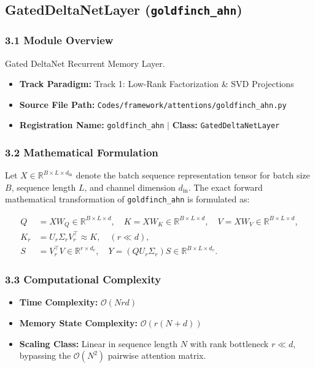 \subsection{GatedDeltaNetLayer (\texttt{goldfinch\_ahn})}
\label{sec:app_module_goldfinch_ahn}

\subsubsection*{3.1 Module Overview}
Gated DeltaNet Recurrent Memory Layer.
\begin{itemize}
    \item \textbf{Track Paradigm:} Track 1: Low-Rank Factorization & SVD Projections
    \item \textbf{Source File Path:} \texttt{Codes/framework/attentions/goldfinch\_ahn.py}
    \item \textbf{Registration Name:} \texttt{goldfinch\_ahn} $\mid$ \textbf{Class:} \texttt{GatedDeltaNetLayer}
\end{itemize}

\subsubsection*{3.2 Mathematical Formulation}
Let $X \in \mathbb{R}^{B \times L \times d_{\text{in}}}$ denote the batch sequence representation tensor for batch size $B$, sequence length $L$, and channel dimension $d_{\text{in}}$. The exact forward mathematical transformation of \texttt{goldfinch\_ahn} is formulated as:

\begin{align}
Q &= X W_Q \in \mathbb{R}^{B \times L \times d}, \quad K = X W_K \in \mathbb{R}^{B \times L \times d}, \quad V = X W_V \in \mathbb{R}^{B \times L \times d}, \\
K_r &= U_r \Sigma_r V_r^\top \approx K, \quad (r \ll d), \\
S &= V_r^\top V \in \mathbb{R}^{r \times d_v}, \quad Y = (Q U_r \Sigma_r) S \in \mathbb{R}^{B \times L \times d_v}.
\end{align}


\subsubsection*{3.3 Computational Complexity}
\begin{itemize}
    \item \textbf{Time Complexity:} $\mathcal{O}(N r d)$
    \item \textbf{Memory State Complexity:} $\mathcal{O}(r(N + d))$
    \item \textbf{Scaling Class:} Linear in sequence length $N$ with rank bottleneck $r \ll d$, bypassing the $\mathcal{O}(N^2)$ pairwise attention matrix.
\end{itemize}


